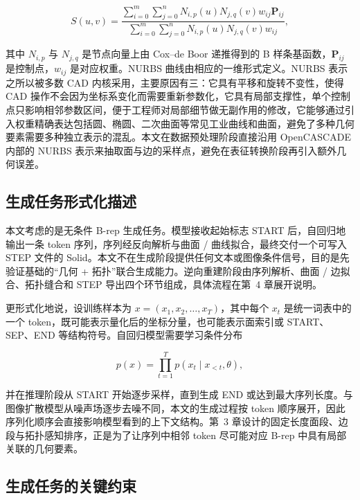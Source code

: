 \begin{equation}
    S(u, v) = \frac{\sum_{i=0}^{m}\sum_{j=0}^{n} N_{i,p}(u) N_{j,q}(v) w_{ij} \mathbf{P}_{ij}}{\sum_{i=0}^{m}\sum_{j=0}^{n} N_{i,p}(u) N_{j,q}(v) w_{ij}},
    \label{eq:nurbs-surface}
\end{equation}

其中 $N_{i,p}$ 与 $N_{j,q}$ 是节点向量上由 Cox--de Boor 递推得到的 B 样条基函数，$\mathbf{P}_{ij}$ 是控制点，$w_{ij}$ 是对应权重。NURBS 曲线由相应的一维形式定义。NURBS 表示之所以被多数 CAD 内核采用，主要原因有三：它具有平移和旋转不变性，使得 CAD 操作不会因为坐标系变化而需要重新参数化，它具有局部支撑性，单个控制点只影响相邻参数区间，便于工程师对局部细节做无副作用的修改，它能够通过引入权重精确表达包括圆、椭圆、二次曲面等常见工业曲线和曲面\cite{shi_2013_cagd_nurbs,piegl_tiller_2010_nurbs_cn,farin_2002_curves_surfaces}，避免了多种几何要素需要多种独立表示的混乱。本文在数据预处理阶段直接沿用 OpenCASCADE 内部的 NURBS 表示来抽取面与边的采样点，避免在表征转换阶段再引入额外几何误差。

\subsection{生成任务形式化描述}

本文考虑的是无条件 B-rep 生成任务。模型接收起始标志 START 后，自回归地输出一条 token 序列，序列经反向解析与曲面 / 曲线拟合，最终交付一个可写入 STEP 文件的 Solid。本文不在生成阶段提供任何文本或图像条件信号，目的是先验证基础的“几何 + 拓扑”联合生成能力。逆向重建阶段由序列解析、曲面 / 边拟合、拓扑缝合和 STEP 导出四个环节组成，具体流程在第~4 章展开说明。

更形式化地说，设训练样本为 $x = (x_1, x_2, \ldots, x_T)$，其中每个 $x_t$ 是统一词表中的一个 token，既可能表示量化后的坐标分量，也可能表示面索引或 START、SEP、END 等结构符号。自回归模型需要学习条件分布

\begin{equation}
    p(x) = \prod_{t=1}^{T} p(x_t \mid x_{<t}, \theta),
    \label{eq:brep-ar-factorization}
\end{equation}

并在推理阶段从 START 开始逐步采样，直到生成 END 或达到最大序列长度。与图像扩散模型从噪声场逐步去噪不同，本文的生成过程按 token 顺序展开，因此序列化顺序会直接影响模型看到的上下文结构。第~3 章设计的固定长度面段、边段与拓扑感知排序，正是为了让序列中相邻 token 尽可能对应 B-rep 中具有局部关联的几何要素。

\subsection{生成任务的关键约束}

